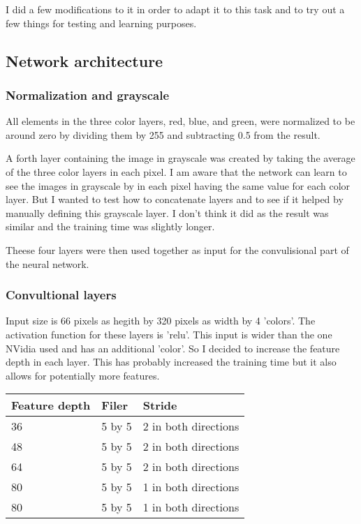 \documentclass[12pt,a4paper]{article}
\begin{document}
I did a few modifications to it in order to adapt it to this task and to try out a few things for testing and learning purposes.

\subsection{Network architecture}

\subsubsection{Normalization and grayscale}
All elements in the three color layers, red, blue, and green, were normalized to be around zero by dividing them by 255 and subtracting 0.5 from the result.

A forth layer containing the image in grayscale was created by taking the average of the three color layers in each pixel. I am aware that the network can learn to see the images in grayscale by in each pixel having the same value for each color layer. But I wanted to test how to concatenate layers and to see if it helped by manually defining this grayscale layer. I don't think it did as the result was similar and the training time was slightly longer.

Theese four layers were then used together as input for the convulisional part of the neural network.

\subsubsection{Convultional layers}
Input size is 66 pixels as hegith by 320 pixels as width by 4 'colors'. The activation function for these layers is 'relu'. This input is wider than the one NVidia used and has an additional 'color'. So I decided to increase the feature depth in each layer. This has probably increased the training time but it also allows for potentially more features.

\begin{tabular}{| l | l | l |}
\hline
Feature depth & Filer & Stride \\
\hline
36 & 5 by 5 & 2 in both directions \\
48 & 5 by 5 & 2 in both directions \\
64 & 5 by 5 & 2 in both directions \\
80 & 5 by 5 & 1 in both directions \\
80 & 5 by 5 & 1 in both directions \\
\hline
\end{tabular}
\end{document}
